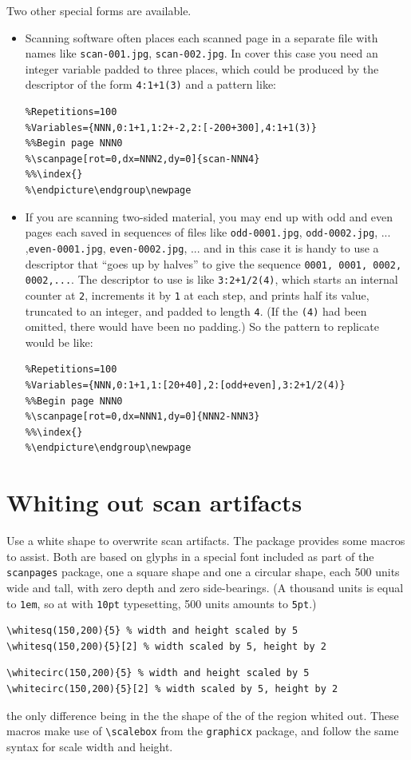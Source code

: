 \documentclass[11pt]{article}
\begin{document}
Two other special forms are available. 
\begin{itemize}
\item
Scanning software often places each scanned page in a separate file with names like {\tt scan-001.jpg}, {\tt scan-002.jpg}. In cover this case you need an integer variable padded to three places, which could be produced by the descriptor of the form {\tt 4:1+1(3)} and a pattern like:
\begin{verbatim}
%Repetitions=100
%Variables={NNN,0:1+1,1:2+-2,2:[-200+300],4:1+1(3)}
%%Begin page NNN0
%\scanpage[rot=0,dx=NNN2,dy=0]{scan-NNN4}
%%\index{}
%\endpicture\endgroup\newpage
\end{verbatim}
\item If you are scanning two-sided material, you may end up with odd and even pages each saved in sequences of files like {\tt odd-0001.jpg}, {\tt odd-0002.jpg}, ... ,{\tt even-0001.jpg}, {\tt even-0002.jpg}, ... and in this case it is handy to use a descriptor that ``goes up by halves'' to give the sequence {\tt 0001, 0001, 0002, 0002,...}. The descriptor to use is like {\tt 3:2+1/2(4)}, which starts an internal counter at {\tt 2}, increments it by {\tt1} at each step, and prints half its value, truncated to an integer, and padded to length {\tt 4}. (If the {\tt(4)} had been omitted, there would have been no padding.) So the pattern to replicate would be like:
\begin{verbatim}
%Repetitions=100
%Variables={NNN,0:1+1,1:[20+40],2:[odd+even],3:2+1/2(4)}
%%Begin page NNN0
%\scanpage[rot=0,dx=NNN1,dy=0]{NNN2-NNN3}
%%\index{}
%\endpicture\endgroup\newpage
\end{verbatim}
\end{itemize}
\section{Whiting out scan artifacts}
Use a white shape to overwrite scan artifacts. The package provides some macros to assist. Both are based on glyphs in a special font included as part of the {\tt scanpages} package, one a square shape and one a circular shape, each 500 units wide and tall, with zero depth and zero side-bearings. (A thousand units is equal to {\tt 1em}, so at with {\tt 10pt} typesetting, 500 units amounts to {\tt 5pt}.)
\begin{verbatim}
\whitesq(150,200){5} % width and height scaled by 5
\whitesq(150,200){5}[2] % width scaled by 5, height by 2
\end{verbatim}
\begin{verbatim}
\whitecirc(150,200){5} % width and height scaled by 5
\whitecirc(150,200){5}[2] % width scaled by 5, height by 2
\end{verbatim}
the only difference being in the the shape of the of the  region whited out. These macros make use of \verb|\scalebox| from the {\tt graphicx} package, and follow the same syntax for scale width and height.
\end{document}
